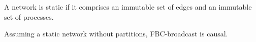 \begin{definition}
  A network is static if it comprises an immutable set of edges and an immutable
  set of processes.
\end{definition}


\begin{theorem}
  Assuming a static network without partitions, FBC-broadcast is causal.
\end{theorem}

